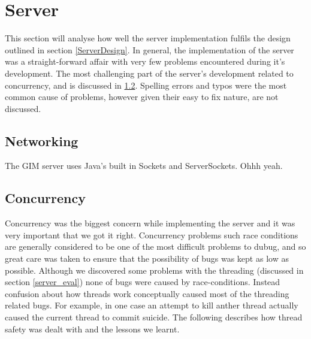 \section{Server}

This section will analyse how well the server implementation fulfils the design outlined in section \ref{ServerDesign}. In general, the implementation of the server was a straight-forward affair with very few problems encountered during it's development. The most challenging part of the server's development related to concurrency, and is discussed in \ref{concur}. Spelling errors and typos were the most common cause of problems, however given their easy to fix nature, are not discussed.

\subsection{Networking}
The GIM server uses Java's built in Sockets and ServerSockets.  Ohhh yeah.

\subsection{Concurrency}
\label{concur}
Concurrency was the biggest concern while implementing the server and it was very important that we got it right. Concurrency problems such race conditions are generally considered to be one of the most difficult problems to dubug, and so great care was taken to ensure that the possibility of bugs was kept as low as possible. Although we discovered some problems with the threading (discussed in section \ref{server_eval}) none of bugs were caused by race-conditions. Instead confusion about how threads work conceptually caused most of the threading related bugs. For example, in one case an attempt to kill anther thread actually caused the current thread to commit suicide. The following describes how thread safety was dealt with and the lessons we learnt.

